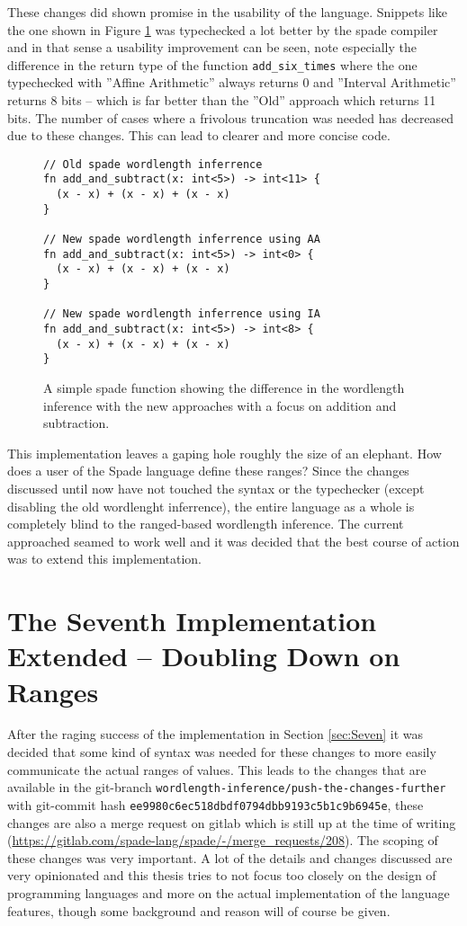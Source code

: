 \documentclass[msc,lith,english]{liuthesis}
\begin{document}
These changes did shown promise in the usability of the language. Snippets like the one shown in Figure \ref{fig:CodeThatWorksNow} was typechecked a lot better by the spade compiler and in that sense a usability improvement can be seen, note especially the difference in the return type of the function \verb+add_six_times+ where the one typechecked with ''Affine Arithmetic'' always returns 0 and ''Interval Arithmetic'' returns 8 bits -- which is far better than the ''Old'' approach which returns 11 bits. The number of cases where a frivolous truncation was needed has decreased due to these changes. This can lead to clearer and more concise code.

\begin{figure}
\begin{verbatim}
// Old spade wordlength inferrence
fn add_and_subtract(x: int<5>) -> int<11> {
  (x - x) + (x - x) + (x - x)
}

// New spade wordlength inferrence using AA
fn add_and_subtract(x: int<5>) -> int<0> {
  (x - x) + (x - x) + (x - x)
}

// New spade wordlength inferrence using IA
fn add_and_subtract(x: int<5>) -> int<8> {
  (x - x) + (x - x) + (x - x)
}
\end{verbatim}
  \caption{A simple spade function showing the difference in the wordlength inference with the new approaches with a focus on addition and subtraction.}
  \label{fig:CodeThatWorksNow}
\end{figure}

This implementation leaves a gaping hole roughly the size of an elephant. How does a user of the Spade language define these ranges? Since the changes discussed until now have not touched the syntax or the typechecker (except disabling the old wordlenght inferrence), the entire language as a whole is completely blind to the ranged-based wordlength inference. The current approached seamed to work well and it was decided that the best course of action was to extend this implementation.

\section{The Seventh Implementation Extended -- Doubling Down on Ranges}
After the raging success of the implementation in Section \ref{sec:Seven} it was decided that some kind of syntax was needed for these changes to more easily communicate the actual ranges of values. This leads to the changes that are available in the git-branch \verb+wordlength-inference/push-the-changes-further+ with git-commit hash \verb+ee9980c6ec518dbdf0794dbb9193c5b1c9b6945e+, these changes are also a merge request on gitlab which is still up at the time of writing (\url{https://gitlab.com/spade-lang/spade/-/merge_requests/208}). The scoping of these changes was very important. A lot of the details and changes discussed are very opinionated and this thesis tries to not focus too closely on the design of programming languages and more on the actual implementation of the language features, though some background and reason will of course be given. 
\end{document}
